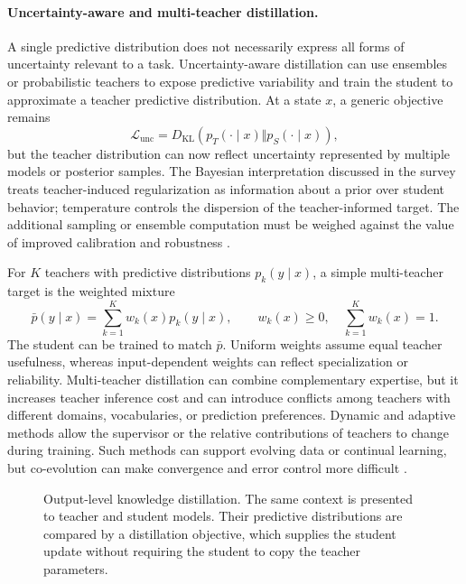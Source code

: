 \paragraph{Uncertainty-aware and multi-teacher distillation.}
A single predictive distribution does not necessarily express all forms of
uncertainty relevant to a task.  Uncertainty-aware distillation can use
ensembles or probabilistic teachers to expose predictive variability and
train the student to approximate a teacher predictive distribution.  At a
state \(x\), a generic objective remains
\begin{equation}
    \mathcal L_{\mathrm{unc}}
    =D_{\mathrm{KL}}\left(
    p_T(\cdot\mid x)\Vert p_S(\cdot\mid x)
    \right),
    \label{eq:distillation-uncertainty-loss}
\end{equation}
but the teacher distribution can now reflect uncertainty represented by
multiple models or posterior samples.  The Bayesian interpretation discussed
in the survey treats teacher-induced regularization as information about a
prior over student behavior; temperature controls the dispersion of the
teacher-informed target.  The additional sampling or ensemble computation
must be weighed against the value of improved calibration and robustness
\parencite{Fang2026KnowledgeDatasetDistillation}.

For \(K\) teachers with predictive distributions \(p_k(y\mid x)\), a
simple multi-teacher target is the weighted mixture
\begin{equation}
    \bar p(y\mid x)
    =\sum_{k=1}^{K}w_k(x)p_k(y\mid x),
    \qquad w_k(x)\geq 0,\quad\sum_{k=1}^{K}w_k(x)=1.
    \label{eq:distillation-multi-teacher-mixture}
\end{equation}
The student can be trained to match \(\bar p\).  Uniform weights assume
equal teacher usefulness, whereas input-dependent weights can reflect
specialization or reliability.  Multi-teacher distillation can combine
complementary expertise, but it increases teacher inference cost and can
introduce conflicts among teachers with different domains, vocabularies, or
prediction preferences.  Dynamic and adaptive methods allow the supervisor
or the relative contributions of teachers to change during training.  Such
methods can support evolving data or continual learning, but co-evolution
can make convergence and error control more difficult
\parencite{Fang2026KnowledgeDatasetDistillation}.

\begin{figure}[htbp]
    \centering
    
    \caption{Output-level knowledge distillation.  The same context is
    presented to teacher and student models.  Their predictive distributions
    are compared by a distillation objective, which supplies the student
    update without requiring the student to copy the teacher parameters.}
    \label{fig:distillation-teacher-student}
\end{figure}

